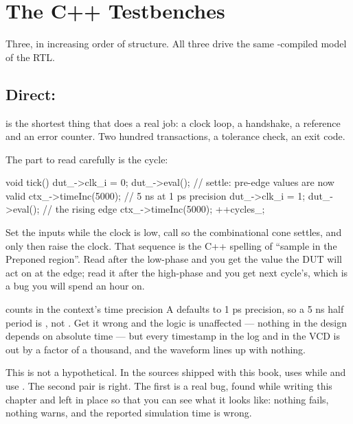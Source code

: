 \clearpage
{}

\clearpage
\section{The C++ Testbenches}
\label{sec:case:cpp}

Three, in increasing order of structure. All three drive the same
-compiled model of the \SV{} RTL.

\subsection{Direct: }

 is the shortest thing that does a real job: a clock
loop, a handshake, a  reference and an error counter. Two
hundred transactions, a tolerance check, an exit code.

The part to read carefully is the cycle:

\begin{cppcode}
void tick() {
  dut_->clk_i = 0;
  dut_->eval();          // settle: pre-edge values are now valid
  ctx_->timeInc(5000);   // 5 ns at 1 ps precision
  dut_->clk_i = 1;
  dut_->eval();          // the rising edge
  ctx_->timeInc(5000);
  ++cycles_;
}
\end{cppcode}

Set the inputs while the clock is low, call  so the
combinational cone settles, and only then raise the clock. That sequence is
the C++ spelling of ``sample in the Preponed region''. Read 
after the low-phase  and you get the value the DUT will act on at
the edge; read it after the high-phase  and you get next
cycle's, which is a bug you will spend an hour on.

\begin{gotcha}{ counts in the context's time precision}
A  defaults to 1 ps precision, so a 5 ns half period is
, not . Get it wrong and the logic is
unaffected --- nothing in the design depends on absolute time --- but every
timestamp in the log and in the VCD is out by a factor of a thousand, and the
waveform lines up with nothing.

This is not a hypothetical. In the sources shipped with this book,
 uses  while  and
 use . The second pair is right.
The first is a real bug, found while writing this chapter and left in place
so that you can see what it looks like: nothing fails, nothing warns, and the
reported simulation time is wrong.
\end{gotcha}

